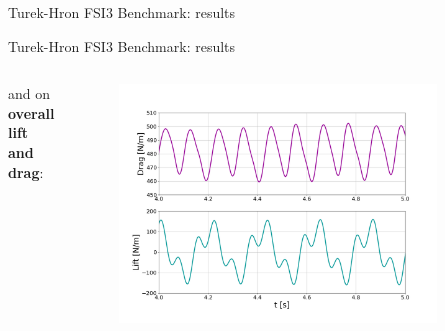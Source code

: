 \documentclass[10pt,t]{beamer}
\begin{document}
\begin{frame}{Turek-Hron FSI3 Benchmark: results}
\end{frame}


\begin{frame}{Turek-Hron FSI3 Benchmark: results}

\begin{columns}

and on\\ \textbf{overall lift and drag}:



\vspace{-1cm}

\begin{figure}[htbp!]
	\centering
	\includegraphics[width=0.9\textwidth, trim=20 40 20 20, clip]{images/FSI3/fsi3_forces_pres.png}
\end{figure}

\end{columns}


\end{frame}
\end{document}
